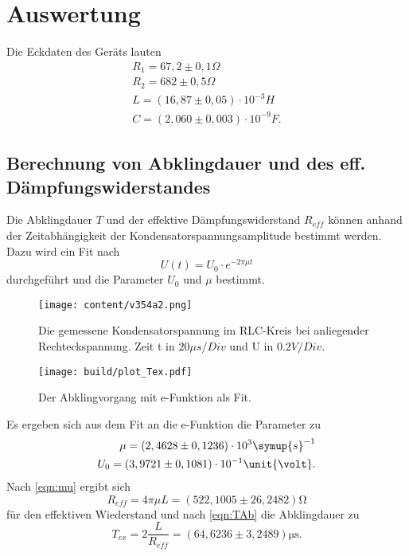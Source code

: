 \section{Auswertung}
\label{sec:Auswertung}

Die Eckdaten des Geräts lauten 
\begin{align}
  R_1 = 67,2 \pm 0,1 \Omega \\
  R_2 = 682 \pm 0,5 \Omega \\
  L = (16,87 \pm 0,05) \cdot 10^{-3}H \\
  C = (2,060 \pm 0,003) \cdot 10^{-9}F.   %
\end{align}






\subsection{Berechnung von Abklingdauer und des eff. Dämpfungswiderstandes}
\label{Abklingdauer und R_daempf}

Die Abklingdauer $T$ und der effektive Dämpfungswiderstand $R_{eff}$ können anhand der Zeitabhängigkeit der Kondensatorspannungsamplitude 
bestimmt werden.\\

\noindent Dazu wird ein Fit nach
\begin{equation*}
    U(t) = U_0 \cdot e^{-2\pi\mu t}
\end{equation*}
durchgeführt und die Parameter $U_0$ und $\mu$ bestimmt.\\

\begin{figure}[H]
  \centering
  \texttt{[image: content/v354a2.png]}
  \caption{Die gemessene Kondensatorspannung im RLC-Kreis bei anliegender Rechteckspannung. Zeit t in $20\mu s/Div$ und U in $0.2V/Div$.}
  \label{fig:MessApp}
\end{figure}



\begin{figure}[H]
  \centering
  \texttt{[image: build/plot\_Tex.pdf]}
  \caption{Der Abklingvorgang mit e-Funktion als Fit.}
  \label{fig:plot_abklingdauer}
\end{figure}

\noindent Es ergeben sich aus dem Fit an die e-Funktion die Parameter zu
\begin{align*}
  \mu = (2,4628\pm 0,1236)\cdot 10^3 \symup{s}^{-1} \\
  U_0 = (3,9721\pm 0,1081)\cdot 10^{-1} \unit{\volt}.
\end{align*}
Nach \eqref{eqn:mu} ergibt sich
\begin{equation*}
  R_{eff} = 4\pi\mu L = (522,1005\pm 26,2482)\unit{\ohm}
\end{equation*}
für den effektiven Wiederstand und nach \eqref{eqn:TAb} die Abklingdauer zu
\begin{equation*}
  T_{ex} = 2\frac{L}{R_{eff}} = (64,6236\pm 3,2489)\unit{\micro\second}.
\end{equation*}



